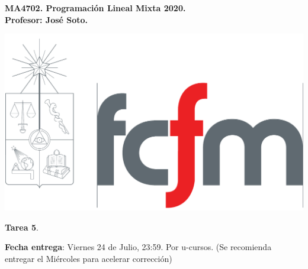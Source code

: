 \documentclass{article}
\theoremstyle{plain}
\theoremstyle{definition}
\theoremstyle{Azul}
\begin{document}
\setlength{\headheight}{14pt}
\vspace*{-1.2 cm}
\begin{minipage}{0.6\textwidth}
	\begin{flushleft}
		\hspace*{-0.5cm}\textbf{MA4702. Programación Lineal Mixta 2020.}\\
		\hspace*{-0.5cm}\textbf{Profesor: José Soto.}\\
	\end{flushleft}
\end{minipage}
\begin{minipage}{0.36\textwidth}
	\begin{flushright}
		\includegraphics[scale=0.15]{fcfm.pdf}
	\end{flushright}
\end{minipage}
\bigskip

\newif\ifsol
\soltrue
\solfalse

\begin{center}
  \LARGE \textbf{Tarea 5}.\\
\end{center}
\bigskip

\noindent\textbf{Fecha entrega}: Viernes 24 de Julio, 23:59. Por u-cursos. (Se recomienda entregar el Miércoles para acelerar corrección)
\end{document}

